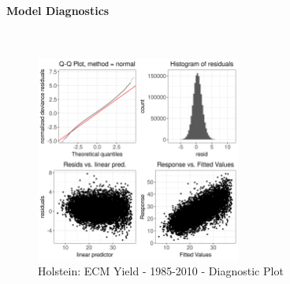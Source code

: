 \paragraph{Model Diagnostics} \quad \\
\begin{figure}[H]
    \centering
    \includegraphics[width=0.6\textwidth]{thesis/figures/models/ecm/before2010/ho_ecm_before2010/ho_ecm_before2010_diagnostics.png}
    \caption[]{Holstein: ECM Yield - 1985-2010 - Diagnostic Plot}
\end{figure}

\newpage
